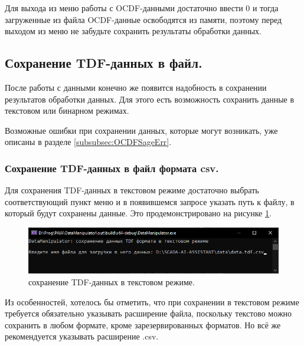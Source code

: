 {\standartFont

  \par Для выхода из меню работы с OCDF-данными достаточно ввести 0 и тогда загруженные из файла OCDF-данные освободятся из памяти, поэтому перед выходом из меню не забудьте сохранить результаты обработки данных. 

  \par
}

\subsection{ \standartTitleFont
  Сохранение TDF-данных в файл.
} \label{subsec:TDFSafe}

{\standartFont

  \par После работы с данными конечно же появится надобность в сохранении результатов обработки данных. Для этого есть возможность сохранить данные в текстовом или бинарном режимах. 

  \par Возможные ошибки при сохранении данных, которые могут возникать, уже описаны в разделе \ref{subsubsec:OCDFSageErr}.

  \par 
}

\subsubsection{ \standartTitleFont
  Сохранение TDF-данных в файл формата csv.
} \label{subsubsec:TDFSafeCSV}

{\standartFont

  \par Для сохранения TDF-данных в текстовом режиме достаточно выбрать соответствующий пункт меню и в появившемся запросе указать путь к файлу, в который будут сохранены данные. Это продемонстрировано на рисунке \ref{fig:TDFsafeCSV}.

  \begin{figure}[H]
    \centering
    \includegraphics[width=\textwidth]{images/forDataManipulator/TDFsafeCSV.png}
    \caption{сохранение TDF-данных в текстовом режиме.} 
    \label{fig:TDFsafeCSV}
  \end{figure}

  \par Из особенностей, хотелось бы отметить, что при сохранении в текстовом режиме требуется обязательно указывать расширение файла, поскольку текстово можно сохранить в любом формате, кроме зарезервированных форматов. Но всё же рекомендуется указывать расширение .csv.
}

